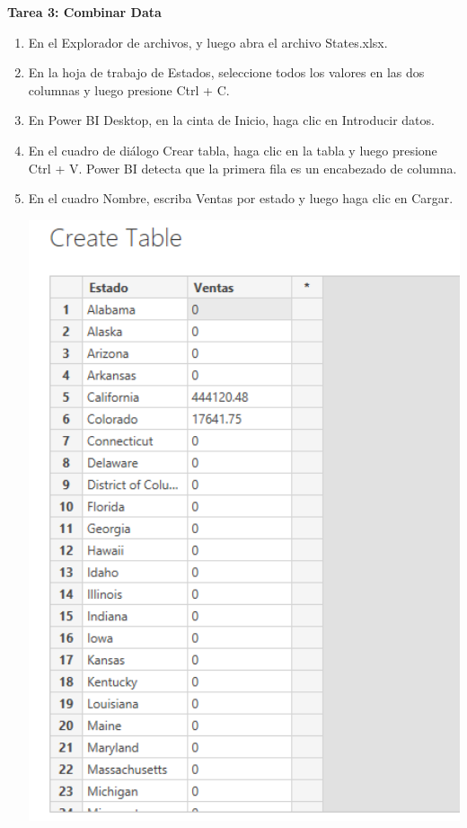 \begin{itemize}
\textbf{Tarea 3: Combinar Data
}
\end{itemize}

\begin{enumerate}
	\item En el Explorador de archivos, y luego abra el archivo States.xlsx.
	
    \item En la hoja de trabajo de Estados, seleccione todos los valores en las dos columnas y luego presione Ctrl + C.
    \item En Power BI Desktop, en la cinta de Inicio, haga clic en Introducir datos.
    \item  En el cuadro de diálogo Crear tabla, haga clic en la tabla y luego presione Ctrl + V. Power BI detecta que la primera fila es un encabezado de columna.
    


    \item En el cuadro Nombre, escriba Ventas por estado y luego haga clic en Cargar.
    
        \begin{center}
	\includegraphics[width=13cm]{./Imagenes/6}
	\end{center}
    

\end{enumerate}
